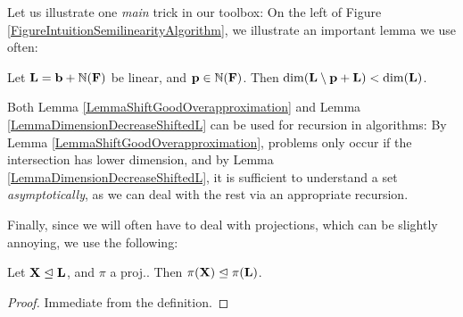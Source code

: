 Let us illustrate one \emph{main} trick in our toolbox: On the left of Figure \ref{FigureIntuitionSemilinearityAlgorithm}, we illustrate an important lemma we use often:

\begin{lemma} \label{LemmaDimensionDecreaseShiftedL}
Let \(\mathbf{L}=\mathbf{b}+\mathbb{N}(\mathbf{F})\) be linear, and \(\mathbf{p} \in \mathbb{N}(\mathbf{F})\). Then \(\dim(\mathbf{L} \setminus \mathbf{p}+\mathbf{L})<\dim(\mathbf{L})\).
\end{lemma}

Both Lemma \ref{LemmaShiftGoodOverapproximation} and Lemma \ref{LemmaDimensionDecreaseShiftedL} can be used for recursion in algorithms: By Lemma \ref{LemmaShiftGoodOverapproximation}, problems only occur if the intersection has lower dimension, and by Lemma \ref{LemmaDimensionDecreaseShiftedL}, it is sufficient to understand a set \emph{asymptotically}, as we can deal with the rest via an appropriate recursion.

Finally, since we will often have to deal with projections, which can be slightly annoying, we use the following:

\begin{lemma} \label{LemmaNiceOverapproximationProjection}
Let \(\mathbf{X} \trianglelefteq \mathbf{L}\), and \(\pi\) a proj.. Then \(\pi(\mathbf{X}) \trianglelefteq \pi(\mathbf{L})\).
\end{lemma}

\begin{proof}
Immediate from the definition.
\end{proof}



















































